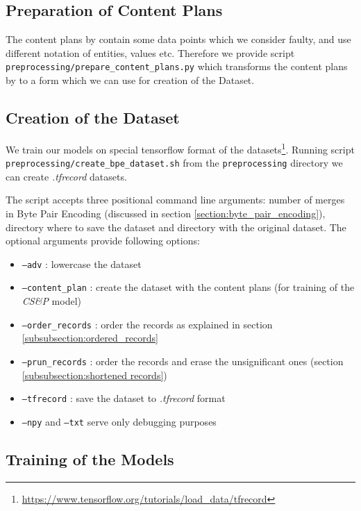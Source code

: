 \subsection{Preparation of Content Plans}

The content plans by \citet{puduppully2019datatotext} contain some data points which we consider faulty, and use different notation of entities, values etc. Therefore we provide script \texttt{preprocessing/prepare\_content\_plans.py} which transforms the content plans by \citet{puduppully2019datatotext} to a form which we can use for creation of the Dataset.

\subsection{Creation of the Dataset}

We train our models on special tensorflow format of the datasets\footnote{\url{https://www.tensorflow.org/tutorials/load_data/tfrecord}}. Running script \texttt{preprocessing/create\_bpe\_dataset.sh} from the \texttt{preprocessing} directory we can create \emph{.tfrecord} datasets.

The script accepts three positional command line arguments: number of merges in Byte Pair Encoding (discussed in section \ref{section:byte_pair_encoding}), directory where to save the dataset and directory with the original dataset. The optional arguments provide following options:
\begin{itemize}
    \item \texttt{--adv} : lowercase the dataset
    \item \texttt{--content\_plan} : create the dataset with the content plans (for training of the \emph{CS\&P} model)
    \item \texttt{--order\_records} : order the records as explained in section \ref{subsubsection:ordered_records}
    \item \texttt{--prun\_records} : order the records and erase the unsignificant ones (section \ref{subsubsection:shortened records})
    \item \texttt{--tfrecord} : save the dataset to \emph{.tfrecord} format
    \item \texttt{--npy} and \texttt{--txt} serve only debugging purposes
\end{itemize}

\subsection{Training of the Models}


